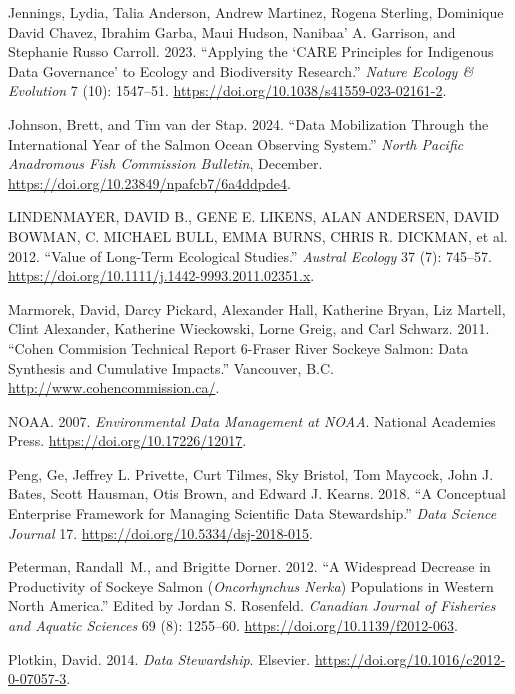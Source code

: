 \documentclass[
  letterpaper,
  DIV=11,
  numbers=noendperiod]{scrartcl}
\newlength{\cslhangindent}
\newenvironment{CSLReferences}[2] %
 {\begin{list}{}{%
  \setlength{\itemindent}{0pt}
  \setlength{\leftmargin}{0pt}
  \setlength{\parsep}{0pt}
  \ifodd #1
   \setlength{\leftmargin}{\cslhangindent}
   \setlength{\itemindent}{-1\cslhangindent}
  \fi
  \setlength{\itemsep}{#2\baselineskip}}}
 {\end{list}}
\begin{document}
\begin{CSLReferences}{1}{0}
Jennings, Lydia, Talia Anderson, Andrew Martinez, Rogena Sterling,
Dominique David Chavez, Ibrahim Garba, Maui Hudson, Nanibaa' A.
Garrison, and Stephanie Russo Carroll. 2023. {``Applying the {`}CARE
Principles for Indigenous Data Governance{'} to Ecology and Biodiversity
Research.''} \emph{Nature Ecology \& Evolution} 7 (10): 1547--51.
\url{https://doi.org/10.1038/s41559-023-02161-2}.

Johnson, Brett, and Tim van der Stap. 2024. {``Data Mobilization Through
the International Year of the Salmon Ocean Observing System.''}
\emph{North Pacific Anadromous Fish Commission Bulletin}, December.
\url{https://doi.org/10.23849/npafcb7/6a4ddpde4}.

LINDENMAYER, DAVID B., GENE E. LIKENS, ALAN ANDERSEN, DAVID BOWMAN, C.
MICHAEL BULL, EMMA BURNS, CHRIS R. DICKMAN, et al. 2012. {``Value of
Long{-}Term Ecological Studies.''} \emph{Austral Ecology} 37 (7):
745--57. \url{https://doi.org/10.1111/j.1442-9993.2011.02351.x}.

Marmorek, David, Darcy Pickard, Alexander Hall, Katherine Bryan, Liz
Martell, Clint Alexander, Katherine Wieckowski, Lorne Greig, and Carl
Schwarz. 2011. {``Cohen Commision Technical Report 6-Fraser River
Sockeye Salmon: Data Synthesis and Cumulative Impacts.''} Vancouver,
B.C. \url{http://www.cohencommission.ca/}.

NOAA. 2007. \emph{Environmental Data Management at NOAA}. National
Academies Press. \url{https://doi.org/10.17226/12017}.

Peng, Ge, Jeffrey L. Privette, Curt Tilmes, Sky Bristol, Tom Maycock,
John J. Bates, Scott Hausman, Otis Brown, and Edward J. Kearns. 2018.
{``A Conceptual Enterprise Framework for Managing Scientific Data
Stewardship.''} \emph{Data Science Journal} 17.
\url{https://doi.org/10.5334/dsj-2018-015}.

Peterman, Randall~M., and Brigitte Dorner. 2012. {``A Widespread
Decrease in Productivity of Sockeye Salmon ({\emph{Oncorhynchus Nerka}})
Populations in Western North America.''} Edited by Jordan S. Rosenfeld.
\emph{Canadian Journal of Fisheries and Aquatic Sciences} 69 (8):
1255--60. \url{https://doi.org/10.1139/f2012-063}.

Plotkin, David. 2014. \emph{Data Stewardship}. Elsevier.
\url{https://doi.org/10.1016/c2012-0-07057-3}.


\end{CSLReferences}
\end{document}
